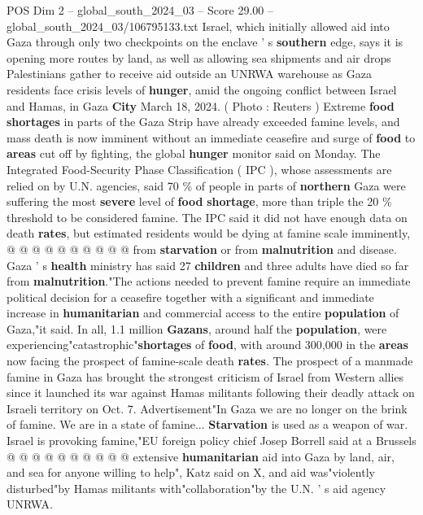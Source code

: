 \begin{textsample}{POS Dim 2 – global\_south\_2024\_03 – Score 29.00 – global\_south\_2024\_03/106795133.txt}  \label{ex:f2_pos_005}
Israel, which initially allowed aid into Gaza through only two checkpoints on the enclave ' s \textbf{southern} edge, says it is opening more routes by land, as well as allowing sea shipments and air drops Palestinians gather to receive aid outside an UNRWA warehouse as Gaza residents face crisis levels of \textbf{hunger}, amid the ongoing conflict between Israel and Hamas, in Gaza \textbf{City} March 18, 2024. ( Photo : Reuters ) Extreme \textbf{food} \textbf{shortages} in parts of the Gaza Strip have already exceeded famine levels, and mass death is now imminent without an immediate ceasefire and surge of \textbf{food} to \textbf{areas} cut off by fighting, the global \textbf{hunger} monitor said on Monday.
The Integrated Food-Security Phase Classification ( IPC ), whose assessments are relied on by U.N. agencies, said 70 \% of people in parts of \textbf{northern} Gaza were suffering the most \textbf{severe} level of \textbf{food} \textbf{shortage}, more than triple the 20 \% threshold to be considered famine.
The IPC said it did not have enough data on death \textbf{rates}, but estimated residents would be dying at famine scale imminently, @ @ @ @ @ @ @ @ @ @ from \textbf{starvation} or from \textbf{malnutrition} and disease.
Gaza ' s \textbf{health} ministry has said 27 \textbf{children} and three adults have died so far from \textbf{malnutrition}."The actions needed to prevent famine require an immediate political decision for a ceasefire together with a significant and immediate increase in \textbf{humanitarian} and commercial access to the entire \textbf{population} of Gaza,"it said.
In all, 1.1 million \textbf{Gazans}, around half the \textbf{population}, were experiencing"catastrophic"\textbf{shortages} of \textbf{food}, with around 300,000 in the \textbf{areas} now facing the prospect of famine-scale death \textbf{rates}.
The prospect of a manmade famine in Gaza has brought the strongest criticism of Israel from Western allies since it launched its war against Hamas militants following their deadly attack on Israeli territory on Oct. 7.
Advertisement"In Gaza we are no longer on the brink of famine.
We are in a state of famine... \textbf{Starvation} is used as a weapon of war.
Israel is provoking famine,"EU foreign policy chief Josep Borrell said at a Brussels @ @ @ @ @ @ @ @ @ @ extensive \textbf{humanitarian} aid into Gaza by land, air, and sea for anyone willing to help", Katz said on X, and aid was"violently disturbed"by Hamas militants with"collaboration"by the U.N. ' s aid agency UNRWA.

\end{textsample}
